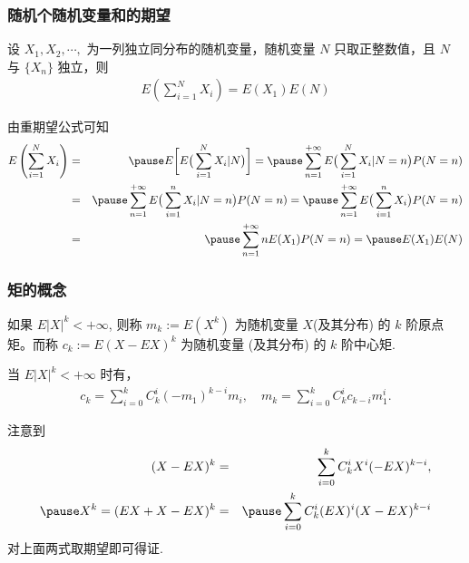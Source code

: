 \documentclass[Prob-All.tex]{subfiles}
\begin{document}
\begin{frame}
	\frametitle{随机个随机变量和的期望}
	\begin{thm}
		设 $X_1,X_2,\cdots,$ 为一列独立同分布的随机变量，随机变量 $N$ 只取正整数值，且 $N$ 与 $\{X_n\}$ 独立，则
		\begin{eqnarray*}
			E\left(\sum_{i=1}^NX_i\right)=E(X_1)E(N)
		\end{eqnarray*}
	\end{thm}

	\pause \zheng 由重期望公式可知
	\begin{eqnarray*}
		E\left(\sum_{i=1}^NX_i\right)&=&\pause E\bigg[ E\big(\sum_{i=1}^NX_i|N\big)\bigg]=\pause \sum_{n=1}^{+\infty}E\big(\sum_{i=1}^NX_i|N=n\big)P(N=n)\\
		&=&\pause \sum_{n=1}^{+\infty}E\big(\sum_{i=1}^nX_i|N=n\big)P(N=n)=\pause \sum_{n=1}^{+\infty}E\big(\sum_{i=1}^nX_i\big)P(N=n)\\
		&=&\pause \sum_{n=1}^{+\infty}nE(X_1)P(N=n)=\pause E(X_1)E(N)\\
	\end{eqnarray*}

\end{frame}
\begin{frame}
	\frametitle{矩的概念}
	\begin{defi}
		如果 $E|X|^k<+\infty$, 则称 $m_k:=E (X^k)$ 为随机变量 $X$(及其分布) 的 $k$ 阶原点矩。而称 $c_k:=E (X-EX)^k$ 为随机变量 (及其分布) 的 $k$ 阶中心矩.
	\end{defi}
	\pause
	\begin{thm}
		当 $E|X|^k<+\infty$ 时有，
		\begin{eqnarray*}
			c_k=\sum_{i=0}^kC_k^i(-m_1)^{k-i}m_i, \quad m_k=\sum_{i=0}^kC_k^ic_{k-i}m_1^i.
		\end{eqnarray*}

	\end{thm}
	\pause
	\zheng 注意到 \pause
	\begin{eqnarray*}
		(X-EX)^k&=&\sum_{i=0}^kC_k^iX^i(-EX)^{k-i}, \\
		\pause X^k=(EX+X-EX)^k&=&\pause \sum_{i=0}^kC_k^i(EX)^i(X-EX)^{k-i}
	\end{eqnarray*}
	\pause 对上面两式取期望即可得证.
\end{frame}
\end{document}
